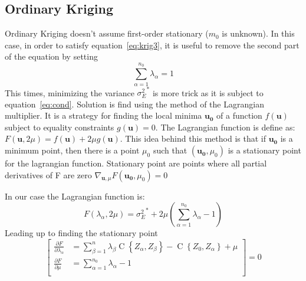 \documentclass[twocolumn]{article}
\numberwithin{equation}{section}
\begin{document}
\subsection{Ordinary Kriging}
Ordinary Kriging doesn't assume first-order stationary ($m_0$ is unknown). In this case, in order to satisfy equation~\ref{eq:krig3}, it is useful to remove the second part of the equation by setting 
\begin{equation} \label{eq:cond}
	\sum_{\alpha=1}^{n_0} \lambda_\alpha=1
\end{equation}
This times, minimizing the variance ${\sigma^2_E}^*$ is more trick as it is subject to equation~\ref{eq:cond}. Solution is find using the method of the Lagrangian multiplier. It is a strategy for finding the local minima $\boldsymbol{u_0}$ of a function $f(\boldsymbol{u})$ subject to equality constraints $g(\boldsymbol{u})=0$. The Lagrangian function is define as: $ F(\boldsymbol{u},2\mu) = f(\boldsymbol{u}) + 2\mu g(\boldsymbol{u})$. This idea behind this method is that if $\boldsymbol{u_0}$ is a minimum point, then there is a point $\mu_0$ such that $(\boldsymbol{u_0}, \mu_0)$ is a stationary point for the lagrangian function. Stationary point are points where all partial derivatives of F are zero $ \nabla_{\boldsymbol{u},\mu} F(\boldsymbol{u_0}, \mu_0)=0 $

In our case the Lagrangian function is:
\begin{equation}
	F(\lambda_\alpha, 2\mu) = {\sigma^2_E}^* + 2\mu \left( \sum_{\alpha=1}^{n_0} \lambda_\alpha - 1\right)
\end{equation}
Leading up to finding the stationary point
\begin{equation} \label{eq:stationnary_pt}
	\left[
	\begin{array}{rl}
		\frac{\partial F}{\partial \lambda_\alpha } &=  \sum_{\beta=1}^n \lambda_\beta \operatorname{C}\left\{Z_\alpha,Z_\beta\right\}
		- \operatorname{C}\left\{Z_0, Z_\alpha \right\}  + \mu \\
		\frac{\partial F}{\partial \mu } &= \sum_{\alpha=1}^{n_0} \lambda_\alpha - 1\\
	\end{array}
	\right]=0
\end{equation}
\end{document}
